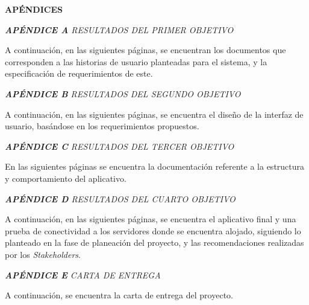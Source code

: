 \documentclass[spanish]{ieee_upb}
\begin{document}
\newpage
\renewcommand\refname{REFERENCIAS}

\newpage
\renewcommand\refname{REFERENCIAS}



\newpage
{}
\begin{center}
\textbf{APÉNDICES}
\end{center}
\appendix

\raggedright\textit{\textbf{APÉNDICE A} RESULTADOS DEL PRIMER OBJETIVO}
\label{APÉNDICE:a}

A continuación, en las siguientes páginas, se encuentran los documentos que corresponden a las historias de usuario planteadas para el sistema, y la especificación de requerimientos de este. 





\raggedright\textit{\textbf{APÉNDICE B} RESULTADOS DEL SEGUNDO OBJETIVO}
\label{APÉNDICE:B}

A continuación, en las siguientes páginas, se encuentra el diseño de la interfaz de usuario, basándose en los requerimientos propuestos. 



\raggedright\textit{\textbf{APÉNDICE C} RESULTADOS DEL TERCER OBJETIVO}
\label{APÉNDICE:C}

En las siguientes páginas se encuentra la documentación referente a la estructura y comportamiento
del aplicativo.  



\raggedright\textit{\textbf{APÉNDICE D} RESULTADOS DEL CUARTO OBJETIVO}
\label{APÉNDICE:D}

A continuación, en las siguientes páginas, se encuentra el aplicativo final y una prueba de conectividad a los servidores donde se encuentra alojado, siguiendo lo planteado en la fase de planeación del proyecto, y las recomendaciones realizadas por los \textit{Stakeholders}. 




\raggedright\textit{\textbf{APÉNDICE E} CARTA DE ENTREGA}
\label{APÉNDICE:E}

A continuación, se encuentra la carta de entrega del proyecto. 


\end{document}
